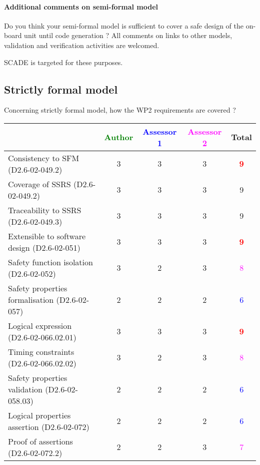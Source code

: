 \paragraph{Additional comments on semi-formal  model} Do you think your semi-formal  model is sufficient to cover a safe design of the on-board unit until code generation ?
All comments on links to  other models, validation and verification activities are welcomed.

\begin{author_comment}
SCADE is targeted for these purposes.   
\end{author_comment}


\subsection{Strictly formal model}

Concerning strictly formal model, how the WP2 requirements are covered ?

\begin{tabular}{|l | c | c | c | c|}
\hline
& \textcolor{green}{Author} & \textcolor{blue}{Assessor 1} & \textcolor{magenta}{Assessor 2} & Total \\
\hline 
Consistency to SFM (D2.6-02-049.2) & 3     & 3     &3 & \textcolor{red}{\textbf{9}} \\
\hline
Coverage of SSRS (D2.6-02-049.2)  &3 & 3     &3 &  9 \\
\hline
Traceability to  SSRS (D2.6-02-049.3)  &3 & 3     &3 &  9 \\
\hline
Extensible to software design (D2.6-02-051)  &3 & 3     &3 & \textcolor{red}{\textbf{9}}  \\
\hline
Safety function isolation (D2.6-02-052)  &  3& 2     &3 & \textcolor{magenta}{8}  \\
\hline 
Safety properties formalisation (D2.6-02-057)  &  2&
2&2 & \textcolor{blue}{6}  \\
\hline
Logical expression (D2.6-02-066.02.01)  &  3&3 &3 & \textcolor{red}{\textbf{9}}  \\
\hline
Timing constraints (D2.6-02-066.02.02)  &  3&2 &3 & \textcolor{magenta}{8} \\
\hline
Safety properties validation (D2.6-02-058.03)  &  2& 2     &2 & \textcolor{blue}{6}  \\
\hline
Logical properties assertion (D2.6-02-072)  &  2& 2     &2 & \textcolor{blue}{6} \\
\hline
Proof of assertions (D2.6-02-072.2)  &  2 & 2     &3 & \textcolor{magenta}{7} \\
\hline
\end{tabular}

